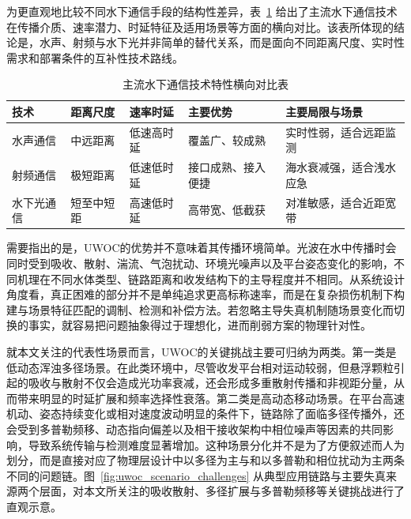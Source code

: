 为更直观地比较不同水下通信手段的结构性差异，表~\ref{tab:underwater_comm_comparison} 给出了主流水下通信技术在传播介质、速率潜力、时延特征及适用场景等方面的横向对比。该表所体现的结论是，水声、射频与水下光并非简单的替代关系，而是面向不同距离尺度、实时性需求和部署条件的互补性技术路线。

\begin{table}[htbp]
    \centering
    \caption{主流水下通信技术特性横向对比表}
    \label{tab:underwater_comm_comparison}
    \footnotesize
    \setlength{\tabcolsep}{4pt}
    \begin{tabular}{l p{1.9cm}p{2.1cm}p{2.3cm}p{3.1cm}}
        \toprule
        技术 & 距离尺度 & 速率时延 & 主要优势 & 主要局限与场景 \\
        \midrule
        水声通信 & 中远距离 & 低速高时延 & 覆盖广、较成熟 & 实时性弱，适合远距监测 \\
        射频通信 & 极短距离 & 低速低时延 & 接口成熟、接入便捷 & 海水衰减强，适合浅水应急 \\
        水下光通信& 短至中短距 & 高速低时延 & 高带宽、低截获 & 对准敏感，适合近距宽带 \\
        \bottomrule
    \end{tabular}
\end{table}

需要指出的是，UWOC的优势并不意味着其传播环境简单。光波在水中传播时会同时受到吸收、散射、湍流、气泡扰动、环境光噪声以及平台姿态变化的影响，不同机理在不同水体类型、链路距离和收发结构下的主导程度并不相同\cite{kaushalUnderwaterOpticalWireless2016a, zengSurveyUnderwaterOptical2017, zayed2026comprehensive}。从系统设计角度看，真正困难的部分并不是单纯追求更高标称速率，而是在复杂损伤机制下构建与场景特征匹配的调制、检测和补偿方法。若忽略主导失真机制随场景变化而切换的事实，就容易把问题抽象得过于理想化，进而削弱方案的物理针对性。

就本文关注的代表性场景而言，UWOC的关键挑战主要可归纳为两类。第一类是低动态浑浊多径场景。在此类环境中，尽管收发平台相对运动较弱，但悬浮颗粒引起的吸收与散射不仅会造成光功率衰减，还会形成多重散射传播和非视距分量，从而带来明显的时延扩展和频率选择性衰落。第二类是高动态移动场景。在平台高速机动、姿态持续变化或相对速度波动明显的条件下，链路除了面临多径传播外，还会受到多普勒频移、动态指向偏差以及相干接收架构中相位噪声等因素的共同影响，导致系统传输与检测难度显著增加\cite{zengSurveyUnderwaterOptical2017, hamdullahModelingOptimizationNLOS2026, jaruwatanadilokUnderwaterWirelessOptical2008, zhuDopplerResistantOrthogonalChirp2022}。这种场景分化并不是为了方便叙述而人为划分，而是直接对应了物理层设计中以多径为主与和以多普勒和相位扰动为主两条不同的问题链。图~\ref{fig:uwoc_scenario_challenges} 从典型应用链路与主要失真来源两个层面，对本文所关注的吸收散射、多径扩展与多普勒频移等关键挑战进行了直观示意。

